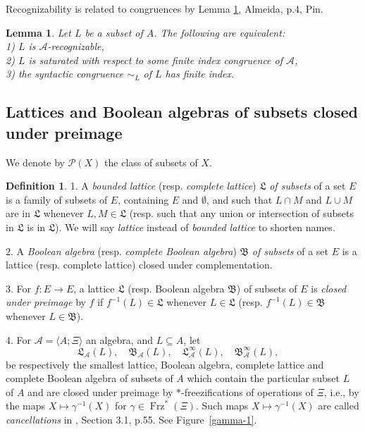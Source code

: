 \documentclass[11pt,a4paper]{article}
\newtheorem{lemma}[theorem]{Lemma}
\theoremstyle{definition} %
\newtheorem{definition}[theorem]{Definition}
\newcommand\+[1]{\mathcal{#1}} %
\newcommand{\Bool}{{\mathfrak{B}}}   %
\newcommand{\Latt}{{\mathfrak{L}}}
\DeclareMathOperator{\freez}{Frz}%
\begin{document}
\noindent Recognizability  is related to congruences by Lemma  \ref{l:rec and congru}, Almeida\cite{almeida}, p.4,  Pin\cite{pin22}. 

\begin{lemma}\label{l:rec and congru}
Let $L$ be a subset  of $A$. The following are equivalent:\\
1)  $L$  is $\+A$-recognizable, \\
2)  $L$  is saturated with respect to some finite index congruence of $\+A$,\\
3) the syntactic congruence $\sim_L$ of $L$ has finite index.
\end{lemma}
%

%
\subsection{Lattices and Boolean algebras of subsets closed under preimage}\label{ss lattices of subsets close by preimage}
We denote by $\+P(X)$ the class of subsets of $X$.
%
\begin{definition}
1. A {\em  bounded  lattice}  (resp. {\em  complete lattice}) $\Latt$ 
{\em of subsets} of a set $E$ 
is a family of subsets of $E$, containing $E$ and $\emptyset$, and
such that $L\cap M$ and $L\cup M$ are in $\Latt$ 
whenever $L,M\in \Latt$
(resp. such that any union or intersection of subsets in $\Latt$ is in $\Latt$). 
We will say {\em lattice} instead of  {\em  bounded  lattice} to shorten names.


2. A {\em Boolean algebra}  (resp. {\em  complete Boolean algebra}) 
$\Bool$ {\em of subsets} of a set $E$ 
is a lattice  (resp. complete lattice) closed under complementation.

3. For  $f:E\to E$,
a lattice $\Latt$ (resp. Boolean algebra $\Bool$) of subsets of $E$ is {\em closed under preimage} by $f$ if
$f^{-1}(L)\in\Latt$ whenever $L\in\Latt$ (resp. $f^{-1}(L)\in\Bool$ whenever $L\in\Bool$).

4. For $\+A=\langle A;\Xi\rangle$  an algebra, and $L\subseteq A$, 
 let 
\begin{equation}\label{eq Latt Bool}
\Latt_{\+A}(L),\quad %
\Bool_{\+A}(L),\quad %
\Latt_{\+A}^\infty(L),\quad %
\Bool_{\+A}^\infty(L),\quad %
\end{equation}
be respectively
the smallest lattice, Boolean algebra, complete lattice and complete Boolean algebra
of subsets of $A$ which
contain the particular subset $L$ of $A$
and are closed under preimage 
by $*$-freezifications of operations of $\Xi$,
i.e., by the maps $X\mapsto\gamma^{-1}(X)$ for $\gamma\in \freez^{*}(\Xi)$.  Such maps  $X\mapsto\gamma^{-1}(X)$ are called {\em cancellations} in \cite{almeida}, Section 3.1, p.55.
See Figure~\ref{gamma-1}.
\end{definition}
\end{document}
